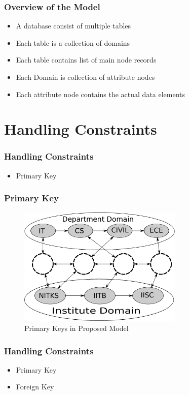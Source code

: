\documentclass[14pt,xcolor=dvipsnames]{beamer}
\begin{document}
\begin{frame}
 \frametitle{Overview of the Model}
 \begin{itemize}
  \item<1-> A database consist of multiple tables
  \item<1-> Each table is a collection of domains
  \item<1-> Each table contains list of main node records
  \item<2-> Each Domain is collection of attribute nodes
  \item<3-> Each attribute node contains the actual data elements
 \end{itemize}
\end{frame}

\section{Handling Constraints}
\begin{frame}
 \frametitle{Handling Constraints}
 \begin{itemize}
  \item Primary Key
 \end{itemize}
\end{frame}

\begin{frame}
 \frametitle{Primary Key}
 \begin{figure}
 \centering
 \includegraphics[width=0.7\textwidth]{pics/primary_key.pdf}
 \caption{Primary Keys in Proposed Model}
 \label{fig:primary_key}
\end{figure}
\end{frame}

\begin{frame}
 \frametitle{Handling Constraints}
 \begin{itemize}
  \item Primary Key
  \item Foreign Key
 \end{itemize}
 \end{frame}
\end{document}
